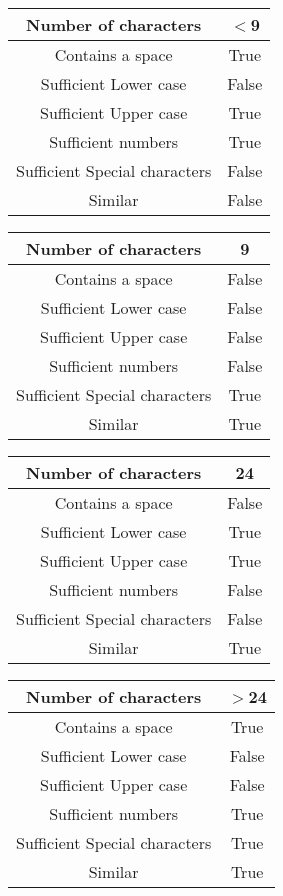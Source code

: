 \documentclass[12pt,letterpaper]{article}
\begin{document}
\begin{center}
    \begin{tabular}{||c|c||}
    \hline
	Number of characters & $<$9 \\
	\hline
	Contains a space & True \\
	\hline
	Sufficient Lower case & False \\
	\hline
	Sufficient Upper case& True \\
	\hline
	Sufficient numbers & True \\
	\hline
	Sufficient Special characters & False \\
	Similar & False \\
    \hline
    \end{tabular}
\end{center}
\begin{center}
    \begin{tabular}{||c|c||}
    \hline
	Number of characters & 9 \\
	\hline
	Contains a space & False \\
	\hline
	Sufficient Lower case & False \\
	\hline
	Sufficient Upper case& False \\
	\hline
	Sufficient numbers & False \\
	\hline
	Sufficient Special characters & True \\
	Similar & True \\
    \hline
    \end{tabular}    
\end{center}
\begin{center}
    \begin{tabular}{||c|c||}
    \hline
	Number of characters & 24 \\
	\hline
	Contains a space & False \\
	\hline
	Sufficient Lower case & True \\
	\hline
	Sufficient Upper case& True \\
	\hline
	Sufficient numbers & False \\
	\hline
	Sufficient Special characters & False \\
	Similar & True \\
    \hline
    \end{tabular}
\end{center}
\begin{center}
    \begin{tabular}{||c|c||}
    \hline
	Number of characters & $>$24 \\
	\hline
	Contains a space & True \\
	\hline
	Sufficient Lower case & False \\
	\hline
	Sufficient Upper case& False \\
	\hline
	Sufficient numbers & True \\
	\hline
	Sufficient Special characters & True \\
	Similar & True \\
    \hline
    \end{tabular}
\end{center}
\end{document}
